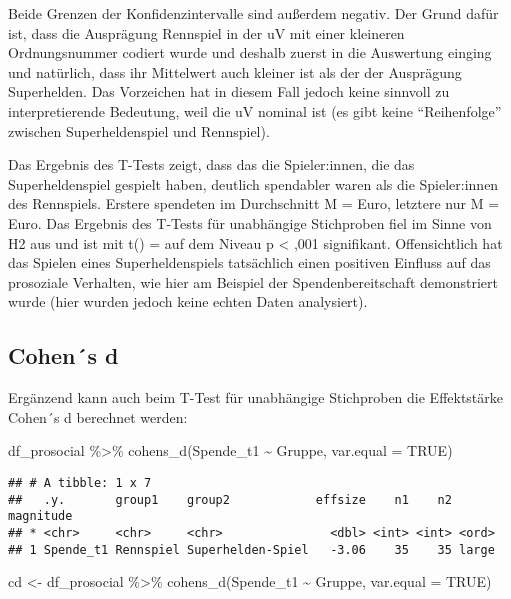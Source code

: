 \documentclass[
]{book}
\newenvironment{Shaded}{\begin{snugshade}}{\end{snugshade}}
\newcommand{\AttributeTok}[1]{\textcolor[rgb]{0.77,0.63,0.00}{#1}}
\newcommand{\ConstantTok}[1]{\textcolor[rgb]{0.00,0.00,0.00}{#1}}
\newcommand{\FunctionTok}[1]{\textcolor[rgb]{0.00,0.00,0.00}{#1}}
\newcommand{\NormalTok}[1]{#1}
\newcommand{\OtherTok}[1]{\textcolor[rgb]{0.56,0.35,0.01}{#1}}
\newcommand{\SpecialCharTok}[1]{\textcolor[rgb]{0.00,0.00,0.00}{#1}}
\begin{document}
Beide Grenzen der Konfidenzintervalle sind außerdem negativ. Der Grund dafür ist, dass die Ausprägung Rennspiel in der uV mit einer kleineren Ordnungsnummer codiert wurde und deshalb zuerst in die Auswertung einging und natürlich, dass ihr Mittelwert auch kleiner ist als der der Ausprägung Superhelden. Das Vorzeichen hat in diesem Fall jedoch keine sinnvoll zu interpretierende Bedeutung, weil die uV nominal ist (es gibt keine ``Reihenfolge'' zwischen Superheldenspiel und Rennspiel).

Das Ergebnis des T-Tests zeigt, dass das die Spieler:innen, die das Superheldenspiel gespielt haben, deutlich spendabler waren als die Spieler:innen des Rennspiels. Erstere spendeten im Durchschnitt M =  Euro, letztere nur M =  Euro. Das Ergebnis des T-Tests für unabhängige Stichproben fiel im Sinne von H2 aus und ist mit t() =  auf dem Niveau p \textless{} ,001 signifikant. Offensichtlich hat das Spielen eines Superheldenspiels tatsächlich einen positiven Einfluss auf das prosoziale Verhalten, wie hier am Beispiel der Spendenbereitschaft demonstriert wurde (hier wurden jedoch keine echten Daten analysiert).

\hypertarget{cohens-d-1}{%
\subsection{Cohen´s d}\label{cohens-d-1}}

Ergänzend kann auch beim T-Test für unabhängige Stichproben die Effektstärke Cohen´s d berechnet werden:

\begin{Shaded}
\begin{Highlighting}[]
\NormalTok{df\_prosocial }\SpecialCharTok{\%\textgreater{}\%} 
  \FunctionTok{cohens\_d}\NormalTok{(Spende\_t1 }\SpecialCharTok{\textasciitilde{}}\NormalTok{ Gruppe, }\AttributeTok{var.equal =} \ConstantTok{TRUE}\NormalTok{) }
\end{Highlighting}
\end{Shaded}

\begin{verbatim}
## # A tibble: 1 x 7
##   .y.       group1    group2            effsize    n1    n2 magnitude
## * <chr>     <chr>     <chr>               <dbl> <int> <int> <ord>    
## 1 Spende_t1 Rennspiel Superhelden-Spiel   -3.06    35    35 large
\end{verbatim}

\begin{Shaded}
\begin{Highlighting}[]
\NormalTok{cd }\OtherTok{\textless{}{-}}\NormalTok{ df\_prosocial }\SpecialCharTok{\%\textgreater{}\%} 
  \FunctionTok{cohens\_d}\NormalTok{(Spende\_t1 }\SpecialCharTok{\textasciitilde{}}\NormalTok{ Gruppe, }\AttributeTok{var.equal =} \ConstantTok{TRUE}\NormalTok{) }
\end{Highlighting}
\end{Shaded}
\end{document}

